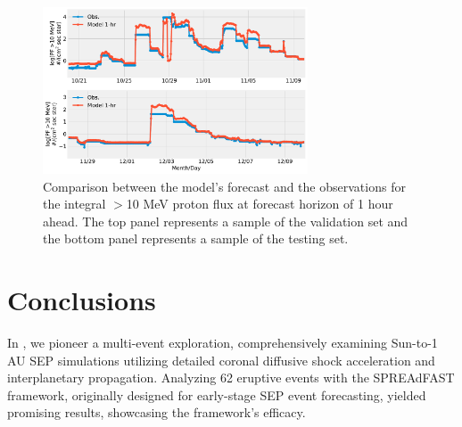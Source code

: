 \begin{table}[!htp]
	\centering
	\caption{The MSE/MAE for the validation and test sets over six forecasting windows.}
	\label{tab:my-table}
\end{table}

\begin{figure}[!htp]
	\centering
	\includegraphics[width=0.7\textwidth]{chapter4/figs/hourly_PF10/sample_valandtestsets_2003.pdf}
	\caption{Comparison between the model’s forecast and the observations for the integral $>$10 MeV proton flux at forecast horizon of 1 hour ahead. The top panel represents a sample of the validation set and the bottom panel represents a sample of the testing set.}
	\label{fig_sample_pf10_hr}
\end{figure}

\section{Conclusions}
In \citet{kozarev_2022}, we pioneer a multi-event exploration, comprehensively examining Sun-to-1 AU SEP simulations utilizing detailed coronal diffusive shock acceleration and interplanetary propagation. Analyzing 62 eruptive events with the SPREAdFAST framework, originally designed for early-stage SEP event forecasting, yielded promising results, showcasing the framework's efficacy.

